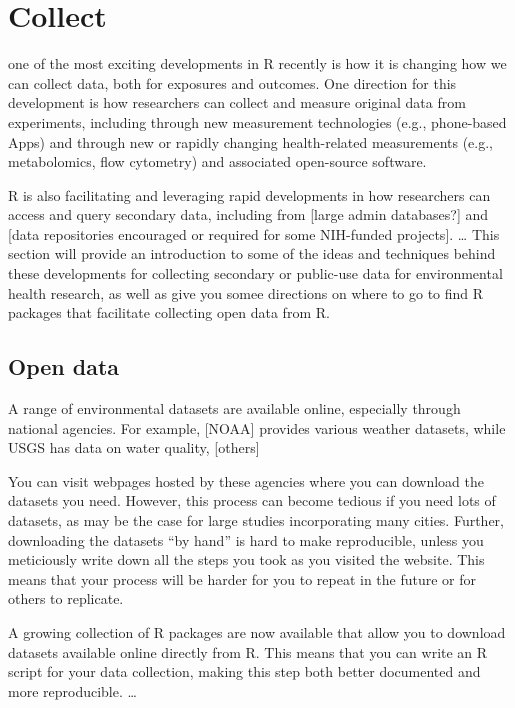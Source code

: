 \documentclass[]{tufte-book}
\begin{document}
\hypertarget{collect}{%
\chapter{Collect}\label{collect}}

 one of the most exciting
developments in R recently is how it is changing how we can collect data, both for
exposures and outcomes. One direction for this development is how researchers can
collect and measure original data from experiments, including through new measurement
technologies (e.g., phone-based Apps) and through new or rapidly changing health-related
measurements (e.g., metabolomics, flow cytometry) and associated open-source
software.

R is also facilitating and leveraging rapid developments in how researchers can access and
query secondary data, including from {[}large admin databases?{]} and {[}data repositories
encouraged or required for some NIH-funded projects{]}. \ldots{} This section will provide an
introduction to some of the ideas and techniques behind these developments for
collecting secondary or public-use data for environmental health research, as well as
give you somee directions on where to go to find R packages that facilitate collecting
open data from R.

\hypertarget{open-data}{%
\section{Open data}\label{open-data}}

A range of environmental datasets are available online, especially through national agencies.
For example, {[}NOAA{]} provides various weather datasets, while USGS has data on water quality,
{[}others{]}

You can visit webpages hosted by these agencies where you can download the datasets you need.
However, this process can become tedious if you need lots of datasets, as may be the case for
large studies incorporating many cities. Further, downloading the datasets ``by hand'' is hard
to make reproducible, unless you meticiously write down all the steps you took as you visited
the website. This means that your process will be harder for you to repeat in the future
or for others to replicate.

A growing collection of R packages are now available that allow you to download datasets
available online directly from R. This means that you can write an R script for your data
collection, making this step both better documented and more reproducible. \ldots{}
\end{document}
